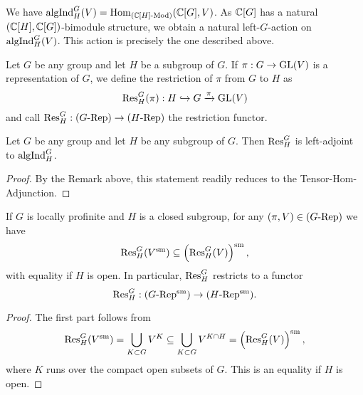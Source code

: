 \documentclass[../main.tex]{subfiles}
\begin{document}
\begin{rmk} 
  We have $\mathrm{algInd}_H^G(V) = \operatorname{Hom}_{{({\mathbb{C}[H]}\text-\allowbreak\mathrm{Mod})}}(\mathbb{C}[G], V)$. As
  $\mathbb{C}[G]$ has a natural $(\mathbb{C}[H], \mathbb{C}[G])$-bimodule structure, we obtain a natural
  left-$G$-action on $\mathrm{algInd}_H^G(V)$. This action is precisely the one
  described above.
\end{rmk}

\begin{defi}\label{def:RestrictionFunctor}
  Let $G$ be any group and let $H$ be a subgroup of $G$.
  If $\pi: G \to \operatorname{GL}(V)$ is a representation of $G$, we define the
  restriction of $\pi$ from $G$ to $H$ as
  \begin{equation*}
    \mathrm{Res}_H^G(\pi): H \hookrightarrow G \xrightarrow{\pi} \operatorname{GL}(V)
  \end{equation*}
  and call $\mathrm{Res}_H^G: {({G}\text-\allowbreak\mathrm{Rep})} \to {({H}\text-\allowbreak\mathrm{Rep})}$ the restriction functor.  
\end{defi}

\begin{lem}\label{lem:AlgFrobRec}
  Let $G$ be any group and let $H$ be any subgroup of $G$. Then 
  $\mathrm{Res}_H^G$ is left-adjoint to $\mathrm{algInd}_H^G$.
\begin{proof}
  By the Remark above, this statement readily reduces to the Tensor-Hom-Adjunction.
\end{proof}
\end{lem}

\begin{lem}\label{lem:SmoothRestriction}
  If $G$ is locally profinite and $H$ is a closed subgroup, for any 
  $(\pi,V) \in {({G}\text-\allowbreak\mathrm{Rep})}$ we have
  \begin{equation*}
    \mathrm{Res}_H^G (V^{\mathrm{sm}}) \subseteq \left( \mathrm{Res}_H^G (V) \right)^{\mathrm{sm}},
  \end{equation*}
  with equality if $H$ is open. 
  In particular, $\mathrm{Res}_H^G$ restricts to a functor
  \begin{equation*}
    \mathrm{Res}_H^G: {({G}\text-\allowbreak\mathrm{Rep^{\mathrm{sm}}})} \to {({H}\text-\allowbreak\mathrm{Rep^{\mathrm{sm}}})}.
  \end{equation*}
\begin{proof}
  The first part follows from
  \begin{equation*}
    \mathrm{Res}_H^G(V^{\mathrm{sm}}) = \bigcup_{K \subset G} V^K \subseteq \bigcup_{K \subset G}
    V^{K \cap H} = \left(\mathrm{Res}_H^G(V)\right)^{\mathrm{sm}},
  \end{equation*}
  where $K$ runs over the compact open subsets of $G$. This is an equality if
  $H$ is open. 
\end{proof}
\end{lem}
\end{document}
